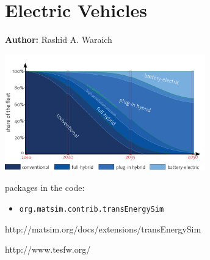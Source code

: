 \chapter{Electric Vehicles }
\label{ch:elvehicles}

\hfill \textbf{Author:} Rashid A. Waraich

\begin{center} \includegraphics[width=0.65\textwidth, angle=0]{extending/figures/Elvehicles/main.png} \end{center}


\citet[][]{WaraichEtAl_TRR_2013, GalusEtAl_STRC_2009, WaraichEtAl_IATBR_2009, GalusEtAl_ITSG_2012, Waraich_PhDThesis_2014, AbedinWaraich_TechRep_IVT_2013, WaraichEtAl_TechRep_IVT_2013, GalusEtAl_ResRep_EWZ_2012, Waraich_unpub_EURO_2012, Waraich_unpub_MATSimUserMeeting_2012, WaraichEtAl_JanssensEtAl_2014, WaraichAxhausen_SDEWES_2013}

packages in the code:
\begin{itemize}
	\item \verb|org.matsim.contrib.transEnergySim|
\end{itemize}

http://matsim.org/docs/extensions/transEnergySim

http://www.tesfw.org/


